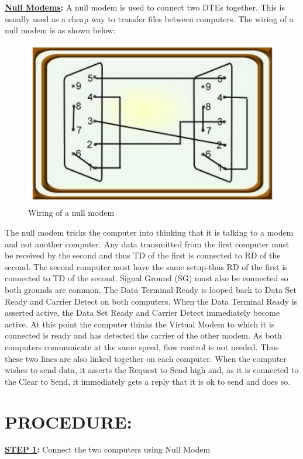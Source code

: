 \documentclass[a4paper,28pt]{report}
\begin{document}
\bgroup
\textbf{\underline{Null Modems}:}
A null modem is used to connect two DTEs together. This is usually used as a cheap way to transfer files between computers. The wiring of a null modem is as shown below:
\begin{figure}[h]
\centering
\includegraphics[scale=0.5]{null-modem}
\caption{Wiring of a null modem}
\end{figure}
\egroup

The null modem tricks the computer into thinking that it is talking to a modem and not another computer. Any data transmitted from the first computer must be received by the second and thus TD of the first is connected to
RD of the second. The second computer must have the same setup-thus RD of the first is connected to TD of the second. Signal Ground (SG) must also be connected so both grounds are common. The Data Terminal Ready is looped back to Data Set Ready and Carrier Detect on both computers. When the Data Terminal Ready is asserted active, the Data Set Ready and Carrier Detect immediately become active. At this point the computer thinks the Virtual Modem to which it is connected is ready and has detected the carrier of the other modem. As both computers
communicate at the same speed, flow control is not needed. Thus these two lines are also linked together on each computer. When the computer wishes to send data, it asserts the Request to Send high and, as it is connected to the Clear to Send, it immediately gets a reply that it is ok to send and does so.

\section*{PROCEDURE:}
\textbf{\underline{STEP 1}:} Connect the two computers using Null Modem
\end{document}
